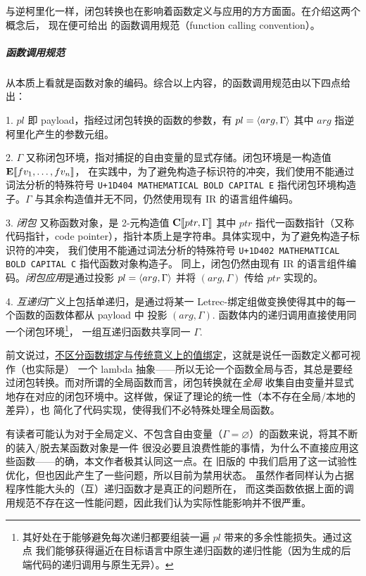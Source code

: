 与逆柯里化一样，闭包转换也在影响着函数定义与应用的方方面面。在介绍这两个概念后，
现在便可给出 \Tigris 的函数调用规范（function calling convention）。

\subparagraph{函数调用规范}\label{fn:calling-conv}从本质上看就是函数对象的编码。综合以上内容，\Tigris 的函数调用规范由以下四点给出：

1. $pl$ 即 payload，指经过闭包转换的函数的参数，有 $pl=\langle arg, \Gamma \rangle$ 其中
$arg$ 指逆柯里化产生的参数元组。

2. $\Gamma$ 又称闭包环境，指对捕捉的自由变量的显式存储。闭包环境是一构造值 $\mathbf{E}\llbracket fv_1,\dots,fv_n \rrbracket$，
在实践中，为了避免构造子标识符的冲突，我们使用不能通过词法分析的特殊符号 \texttt{U+1D404 MATHEMATICAL BOLD CAPITAL E}
指代闭包环境构造子。$\Gamma$ 与其余构造值并无不同，仍然使用现有 IR 的语言组件编码。

3. \emph{闭包} 又称函数对象，是 2-元构造值 $\mathbf{C}\llbracket ptr, \Gamma \rrbracket$ 其中 $ptr$
指代一函数指针（又称代码指针，code pointer），指针本质上是字符串。具体实现中，为了避免构造子标识符的冲突，
我们使用不能通过词法分析的特殊符号 \texttt{U+1D402 MATHEMATICAL BOLD CAPITAL C} 指代函数对象构造子。
同上，闭包仍然由现有 IR 的语言组件编码。\emph{闭包应用}是通过投影 $pl=\langle arg, \Gamma \rangle$ 并将 $(arg, \Gamma)$ 传给 $ptr$ 实现的。

4. \emph{互递归}广义上包括单递归，是通过将某一 Letrec-绑定组做变换使得其中的每一个函数的函数体都从 payload 中
投影 $(arg, \Gamma)$. 函数体内的递归调用直接使用同一个闭包环境\footnote{
  其好处在于能够避免每次递归都要组装一遍 $pl$ 带来的多余性能损失。通过这点
  我们能够获得逼近在目标语言中原生递归函数的递归性能（因为生成的后端代码的递归调用与原生无异）。
}，
一组互递归函数共享同一 $\Gamma$.

前文说过，\underline{\Tigris 不区分函数绑定与传统意义上的值绑定}，这就是说任一函数定义都可视作（也实际是）
一个 lambda 抽象——所以无论一个函数全局与否，其总是要经过闭包转换。而对所谓的全局函数而言，闭包转换就在\emph{全局}
收集自由变量并显式地存在对应的闭包环境中。这样做，保证了理论的统一性（\lambdacalc 本不存在全局/本地的差异），也
简化了代码实现，使得我们不必特殊处理全局函数。

\begin{remark}[性能考量]
  有读者可能认为对于全局定义、不包含自由变量（$\Gamma=\varnothing$）的函数来说，将其不断的装入/脱去某函数对象是一件
  很没必要且浪费性能的事情，为什么不直接应用这些函数——的确，本文作者极其认同这一点。在
  旧版的 \Tigris 中我们启用了这一试验性优化，但也因此产生了一些问题，所以目前为禁用状态。
  虽然作者同样认为占据程序性能大头的（互）递归函数才是真正的问题所在，
  而这类函数依据上面的调用规范不存在这一性能问题，因此我们认为实际性能影响并不很严重。
\end{remark}

